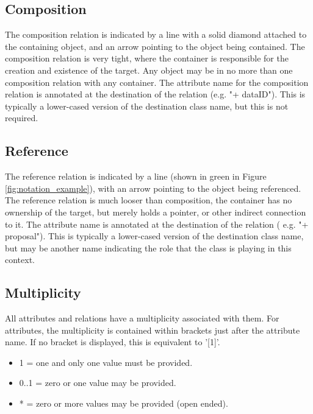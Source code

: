   \subsection{Composition}
  \label{sect:Composition}
  The composition relation is indicated by a line with a solid diamond attached to the
containing object, and an arrow pointing to the object being contained. The composition relation is
very tight, where the container is responsible for the creation and existence of the target. Any
object may be in no more than one composition relation with any container. The attribute name
for the composition relation is annotated at the destination of the relation (e.g. "+ dataID"). This is
typically a lower-cased version of the destination class name, but this is not required.

  \subsection{Reference}
  \label{sect:Reference}
  The reference relation is indicated by a line (shown in green in Figure \ref{fig:notation_example}), with an arrow pointing to the object being
referenced. The reference relation is much looser than composition, the container has no
ownership of the target, but merely holds a pointer, or other indirect connection to it. The
attribute name is annotated at the destination of the relation ( e.g. "+ proposal"). This is typically
a lower-cased version of the destination class name, but may be another name indicating the role
that the class is playing in this context.

  \subsection{Multiplicity}
  \label{sect:Multiplicity}
  All attributes and relations have a multiplicity associated with them. For attributes, the multiplicity
is contained within brackets just after the attribute name. If no bracket is displayed, this is
equivalent to '[1]'.
\begin{itemize}
\item 1 = one and only one value must be provided.
\item 0..1 = zero or one value may be provided.
\item * = zero or more values may be provided (open ended).
\end{itemize}

